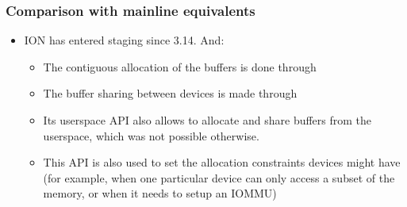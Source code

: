 \begin{frame}
  \frametitle{Comparison with mainline equivalents}
  \begin{itemize}
    \item ION has entered staging since 3.14. And:
    \begin{itemize}
    \item The contiguous allocation of the buffers is done through
    \item The buffer sharing between devices is made through
    \item Its userspace API also allows to allocate and share buffers
      from the userspace, which was not possible otherwise.
    \item This API is also used to set the allocation constraints
      devices might have (for example, when one particular device can
      only access a subset of the memory, or when it needs to setup an
      IOMMU)
    \end{itemize}
  \end{itemize}
\end{frame}
